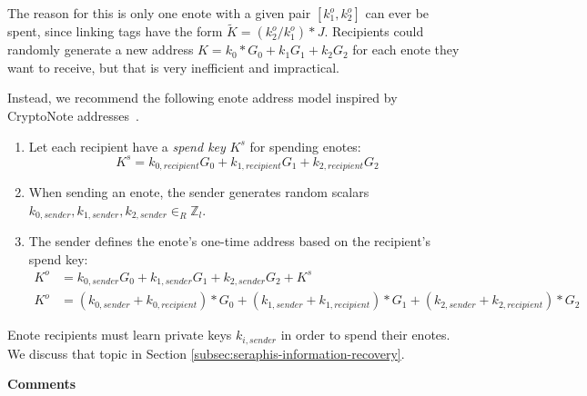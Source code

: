 The reason for this is only one enote with a given pair $[k^o_1, k^o_2]$ can ever be spent, since linking tags have the form $\tilde{K} = (k^o_2/k^o_1)*J$. Recipients could randomly generate a new address $K = k_0*G_0 + k_1 G_1 + k_2 G_2$ for each enote they want to receive, but that is very inefficient and impractical.

Instead, we recommend the following enote address model inspired by CryptoNote addresses~\cite{cryptoNoteWhitePaper}.

\begin{enumerate}
    \item Let each recipient have a {\em spend key} $K^s$ for spending enotes:\vspace{.115cm}
    \[K^s = k_{0, recipient} G_0 + k_{1, recipient} G_1 + k_{2, recipient} G_2\]

    \item When sending an enote, the sender generates random scalars $k_{0, sender}, k_{1, sender}, k_{2, sender} \in_R \mathbb{Z}_l$.

    \item The sender defines the enote's one-time address based on the recipient's spend key:\vspace{.115cm}
    \begin{align*}
        K^o &= k_{0, sender} G_0 + k_{1, sender} G_1 + k_{2, sender} G_2 + K^s \\
        K^o &= (k_{0, sender} + k_{0, recipient})*G_0 + (k_{1, sender} + k_{1, recipient})*G_1 + (k_{2, sender} + k_{2, recipient})*G_2
    \end{align*}
\end{enumerate}

Enote recipients must learn private keys $k_{i, sender}$ in order to spend their enotes. We discuss that topic in Section \ref{subsec:seraphis-information-recovery}.

\textbf{Comments}

